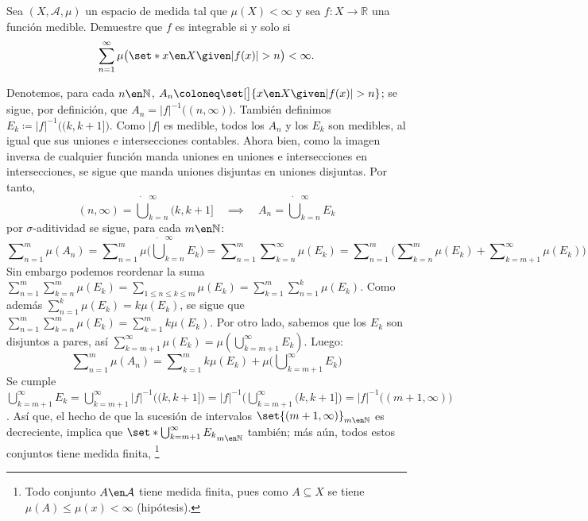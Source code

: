 \setcounter{neje}{62}
\begin{nejer}[Repetido]
Sea $(X, \mathcal{A}, \mu)$ un espacio de medida tal que $\mu(X) < \infty$ y sea $f \colon X \to \mathbb{R}$ una función medible. Demuestre que $f$ es integrable si y solo si
$$
\sum_{n=1}^{\infty} \mu\big(\set*{x \en X \given |f(x)| > n}\big) < \infty.
$$
\end{nejer}
\begin{sol}
Denotemos, para cada $n\en\mathbb{N}$, $A_n \coloneq \set[\big]{x \en X \given |f(x)|>n}$; se sigue, por definición, que $A_n = |f|^{-1}\big((n,\infty)\big)$. También definimos $E_k \coloneq |f|^{-1}\big((k,k+1]\big)$. Como $|f|$ es medible, todos los $A_n$ y los $E_k$ son medibles, al igual que sus uniones e intersecciones contables. Ahora bien, como la imagen inversa de cualquier función manda uniones en uniones e intersecciones en intersecciones, se sigue que manda uniones disjuntas en uniones disjuntas. Por tanto,
\[
(n,\infty) = \dot\bigcup^\infty_{k=n}(k,k+1]%
\quad\implies\quad%
A_n = \dot\bigcup^\infty_{k=n}E_k
\]
por $\sigma$-aditividad se sigue, para cada $m\en\mathbb{N}$:
\[
\sum\nolimits^m_{n=1}\mu(A_n)%
=\sum\nolimits^m_{n=1}\mu\Big( \dot\bigcup^\infty_{k=n}E_k \Big)%
=\sum\nolimits^m_{n=1}\sum\nolimits^\infty_{k=n}\mu(E_k)%
=\sum\nolimits^m_{n=1}\Big(\sum\nolimits^m_{k=n}\mu(E_k) + \sum\nolimits^\infty_{k=m+1}\mu(E_k)\Big)
\]
Sin embargo podemos reordenar la suma $\sum^m_{n=1}\sum^m_{k=n}\mu(E_k) = \sum_{1\leq n \leq k \leq m} \mu(E_k) = \sum^m_{k=1}\sum^k_{n=1}\mu(E_k)$. Como además $\sum^k_{n=1}\mu(E_k) = k\mu(E_k)$, se sigue que $\sum^m_{n=1}\sum^m_{k=n}\mu(E_k) = \sum^m_{k=1}k\mu(E_k)$. Por otro lado, sabemos que los $E_k$ son disjuntos a pares, así $\sum^\infty_{k=m+1}\mu(E_k) = \mu(\bigcup^\infty_{k=m+1}E_k)$. Luego:
\begin{equation}\label{eq:reord2}
\sum\nolimits^m_{n=1}\mu(A_n)%
= \sum\nolimits^m_{k=1}k\mu(E_k) + \mu\Big( \bigcup\nolimits^\infty_{k=m+1}E_k \Big)
\end{equation}
Se cumple $\bigcup^\infty_{k=m+1} E_k = \bigcup^\infty_{k=m+1}|f|^{-1}\big((k,k+1]\big) = |f|^{-1}\big(\bigcup^\infty_{k=m+1}(k,k+1]\big) =|f|^{-1}\big((m+1,\infty)\big)$. Así que, el hecho de que la sucesión de intervalos $\set{(m+1,\infty)}_{m\en\mathbb{N}}$ es decreciente, implica que $\set*{\bigcup^\infty_{k=m+1} E_k}_{m\en\mathbb{N}}$ también; más aún, todos estos conjuntos tiene medida finita,%
\footnote{
    Todo conjunto $A \en \mathcal{A}$ tiene medida finita, pues como $A\subseteq X$ se tiene $\mu(A) \leq \mu(x) < \infty$ (hipótesis).
}
\end{sol}
